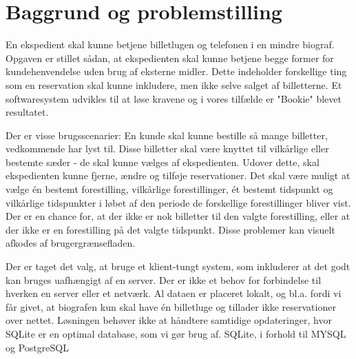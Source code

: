 \chapter{Baggrund og problemstilling}





En ekspedient skal kunne betjene billetlugen og telefonen i en mindre biograf. Opgaven er stillet sådan, at ekspedienten skal kunne betjene begge former for kundehenvendelse uden brug af eksterne midler. Dette indeholder forskellige ting som en reservation skal kunne inkludere, men ikke selve salget af billetterne. Et softwaresystem udvikles til at løse kravene og i vores tilfælde er "Bookie" blevet resultatet.

Der er visse brugsscenarier: En kunde skal kunne bestille så mange billetter, vedkommende har lyst til. Disse billetter skal være knyttet til vilkårlige eller bestemte sæder - de skal kunne vælges af ekspedienten. Udover dette, skal ekspedienten kunne fjerne, ændre og tilføje reservationer. Det skal være muligt at vælge én bestemt forestilling, vilkårlige forestillinger, ét bestemt tidspunkt og vilkårlige tidspunkter i løbet af den periode de forskellige forestillinger bliver vist.
Der er en chance for, at der ikke er nok billetter til den valgte forestilling, eller at der ikke er en forestilling på det valgte tidspunkt. Disse problemer kan visuelt afkodes af brugergrænsefladen.

Der er taget det valg, at bruge et klient-tungt system, som inkluderer at det godt kan bruges uafhængigt af en server. Der er ikke et behov for forbindelse til hverken en server eller et netværk. Al dataen er placeret lokalt, og  bl.a. fordi vi får givet, at biografen kun skal have én billetluge og tillader ikke reservationer over nettet. Løsningen behøver ikke at håndtere samtidige opdateringer, hvor SQLite er en optimal database, som vi gør brug af. SQLite, i forhold til MYSQL og PostgreSQL



